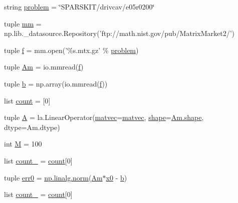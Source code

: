 \begin{DoxyCompactItemize}
\item 
string \hyperlink{namespacedemo__lgmres_a5ed74fb00faa6f503aba95750d375bea}{problem} = \char`\"{}S\+P\+A\+R\+S\+K\+I\+T/drivcav/e05r0200\char`\"{}
\item 
tuple \hyperlink{namespacedemo__lgmres_aab755b9e30b356805a0987d4628145e6}{mm} = np.\+lib.\+\_\+datasource.\+Repository('ftp\+://math.\+nist.\+gov/pub/Matrix\+Market2/')
\item 
tuple \hyperlink{namespacedemo__lgmres_acf69589796371cd6bf3c673ea0ab23ac}{f} = mm.\+open('\%s.\+mtx.\+gz' \% \hyperlink{namespacedemo__lgmres_a5ed74fb00faa6f503aba95750d375bea}{problem})
\item 
tuple \hyperlink{namespacedemo__lgmres_afc20f9e38da2eac6a55e8a2d6e4ea957}{Am} = io.\+mmread(\hyperlink{namespacedemo__lgmres_acf69589796371cd6bf3c673ea0ab23ac}{f})
\item 
tuple \hyperlink{namespacedemo__lgmres_ad5208339e2d70ebaceb6d7dfaa870ae6}{b} = np.\+array(io.\+mmread(\hyperlink{namespacedemo__lgmres_acf69589796371cd6bf3c673ea0ab23ac}{f}))
\item 
list \hyperlink{namespacedemo__lgmres_ac9e673dc62252034a7fe574079efd706}{count} = \mbox{[}0\mbox{]}
\item 
tuple \hyperlink{namespacedemo__lgmres_a29e83fa149c2f8266e6129af1741a67f}{A} = la.\+Linear\+Operator(\hyperlink{namespacedemo__lgmres_a0b933f4e768a500950c8f0e736826307}{matvec}=\hyperlink{namespacedemo__lgmres_a0b933f4e768a500950c8f0e736826307}{matvec}, \hyperlink{shape_8h_a9d9da3dcaecbbde6cf1961063f2e838b}{shape}=\hyperlink{shape_8h_a9d9da3dcaecbbde6cf1961063f2e838b}{Am.\+shape}, dtype=Am.\+dtype)
\item 
int \hyperlink{namespacedemo__lgmres_a2ec1c24106943f3ecb84af982a6fee3f}{M} = 100
\item 
list \hyperlink{namespacedemo__lgmres_a79b07e79e94a879b1e523ece055df7fe}{count\+\_} = \hyperlink{namespacedemo__lgmres_ac9e673dc62252034a7fe574079efd706}{count}\mbox{[}0\mbox{]}
\item 
tuple \hyperlink{namespacedemo__lgmres_a857086fbd9bf98d9f6f130668505c223}{err0} = \hyperlink{vecnorm_8cc_a57c51d3f8cc26dd32ade0c9cd6b4997e}{np.\+linalg.\+norm}(\hyperlink{namespacedemo__lgmres_afc20f9e38da2eac6a55e8a2d6e4ea957}{Am}$\ast$\hyperlink{gendata_8m_aa48da42c617fdb7cf84e9a3f80aa04e8}{x0} -\/ \hyperlink{namespacedemo__lgmres_ad5208339e2d70ebaceb6d7dfaa870ae6}{b})
\item 
list \hyperlink{namespacedemo__lgmres_ad3fa23497c9b75adefbbec0118ca48c0}{count\+\_} = \hyperlink{namespacedemo__lgmres_ac9e673dc62252034a7fe574079efd706}{count}\mbox{[}0\mbox{]}

\end{DoxyCompactItemize}
